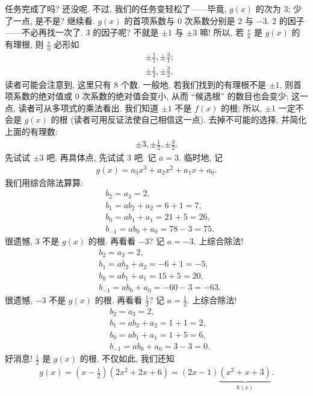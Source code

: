 \begin{example}
    任务完成了吗? 还没呢. 不过, 我们的任务变轻松了——毕竟, $g(x)$ 的次为 $3$; 少了一点, 是不是? 继续看. $g(x)$ 的首项系数与 $0$ 次系数分别是 $2$ 与 $-3$. $2$ 的因子——不必再找一次了. $3$ 的因子呢? 不就是 $\pm 1$ 与 $\pm 3$ 嘛! 所以, 若 $\frac{v}{u}$ 是 $g(x)$ 的有理根, 则 $\frac{v}{u}$ 必形如
    \begin{align*}
         & {\pm \frac{1}{1}}, {\pm \frac{3}{1}}; \\
         & {\pm \frac{1}{2}}, {\pm \frac{3}{2}}.
    \end{align*}
    读者可能会注意到, 这里只有 $8$ 个数. 一般地, 若我们找到的有理根不是 $\pm 1$, 则首项系数的绝对值或 $0$ 次系数的绝对值会变小, 从而 ``候选根'' 的数目也会变少; 这一点, 读者可从多项式的乘法看出. 我们知道 $\pm 1$ 不是 $f(x)$ 的根; 所以, $\pm 1$ 一定不会是 $g(x)$ 的根 (读者可用反证法使自己相信这一点). 去掉不可能的选择, 并简化上面的有理数:
    \begin{align*}
        \pm 3, \pm \frac{1}{2}, \pm \frac{3}{2}.
    \end{align*}
    先试试 $\pm 3$ 吧. 再具体点, 先试试 $3$ 吧. 记 $a = 3$. 临时地, 记
    \begin{align*}
        g(x) = a_3 x^3 + a_2 x^2 + a_1 x + a_0.
    \end{align*}
    我们用综合除法算算:
    \begin{align*}
         & b_2 = a_3 = 2,                      \\
         & b_1 = a b_2 + a_2 = 6 + 1 = 7,      \\
         & b_0 = a b_1 + a_1 = 21 + 5 = 26,    \\
         & b_{-1} = a b_0 + a_0 = 78 - 3 = 75.
    \end{align*}
    很遗憾, $3$ 不是 $g(x)$ 的根. 再看看 $-3$? 记 $a = -3$. 上综合除法!
    \begin{align*}
         & b_2 = a_3 = 2,                        \\
         & b_1 = a b_2 + a_2 = -6 + 1 = -5,      \\
         & b_0 = a b_1 + a_1 = 15 + 5 = 20,      \\
         & b_{-1} = a b_0 + a_0 = -60 - 3 = -63.
    \end{align*}
    很遗憾, $-3$ 不是 $g(x)$ 的根. 再看看 $\frac{1}{2}$? 记 $a = \frac{1}{2}$. 上综合除法!
    \begin{align*}
         & b_2 = a_3 = 2,                    \\
         & b_1 = a b_2 + a_2 = 1 + 1 = 2,    \\
         & b_0 = a b_1 + a_1 = 1 + 5 = 6,    \\
         & b_{-1} = a b_0 + a_0 = 3 - 3 = 0.
    \end{align*}
    好消息! $\frac{1}{2}$ 是 $g(x)$ 的根. 不仅如此, 我们还知
    \begin{align*}
        g(x) = \left(x - \frac{1}{2}\right) (2x^2 + 2x + 6) = (2x - 1) \underbrace{(x^2 + x + 3)}_{h(x)}.
    \end{align*}


\end{example}
